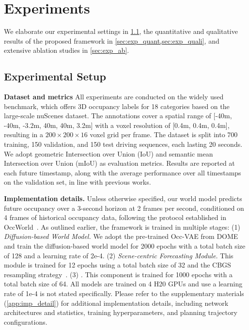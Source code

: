 \section{Experiments}\label{sec:exp}

We elaborate our experimental settings in \cref{sec:exp_setup}, the quantitative and qualitative results of the proposed \mtd{} framework in \cref{sec:exp_quant,sec:exp_quali}, 
and extensive ablation studies in \cref{sec:exp_ab}.

\subsection{Experimental Setup}\label{sec:exp_setup}

\textbf{Dataset and metrics}
All experiments are conducted on the widely used \occnus{}\cite{occ3d} benchmark, which offers 3D occupancy labels for 18 categories 
 based on the large-scale nuScenes\cite{nuscenes} dataset.
The annotations cover a spatial range of [-40m, -40m, -3.2m, 40m, 40m, 3.2m] with a voxel resolution of [0.4m, 0.4m, 0.4m], resulting in a $200\times 200 \times 16$ voxel grid per frame.
The dataset is split into 700 training, 150 validation, and 150 test driving sequences, each lasting 20 seconds.
We adopt geometric Intersection over Union (IoU) and semantic mean Intersection over Union (mIoU) as evaluation metrics. Results are reported at each future timestamp, along with the average performance over all timestamps on the validation set, in line with previous works.

\textbf{Implementation details.}\label{sec:imp_detail}
Unless otherwise specified, our world model predicts future occupancy over a 3-second horizon at 2 frames per second, conditioned on 4 frames of historical occupancy data, following the protocol established in OccWorld~\cite{occworld}.
As outlined earlier, the \mtd{} framework is trained in multiple stages:
(1) \textit{Diffusion-based World Model.} 
We adopt the pre-trained Occ-VAE from DOME~\cite{dome} and train the diffusion-based world model for 2000 epochs with a total batch size of 128 and a learning rate of 2e-4.
(2) \textit{Scene-centric Forecasting Module.} 
This module is trained for 12 epochs using a total batch size of 32 and the CBGS resampling strategy~\cite{cbgs}.
(3) \textit{\mtd{} \ctln{}.} 
This component is trained for 1000 epochs with a total batch size of 64. 
All models are trained on 4 H20 GPUs and use a learning rate of 1e-4 is not stated specifically.
Please refer to the supplementary materials (\cref{app:imp_detail}) for additional implementation details, including network architectures and statistics, training hyperparameters, and planning trajectory configurations.



